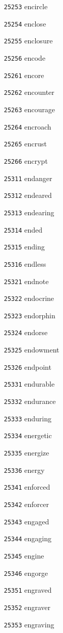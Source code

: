 \documentclass[twoside,11pt]{article}
\begin{document}
\begin{multicols}{5}
\begin{enumerate}
\item[\texttt{25253}] encircle
\item[\texttt{25254}] enclose
\item[\texttt{25255}] enclosure
\item[\texttt{25256}] encode
\item[\texttt{25261}] encore
\item[\texttt{25262}] encounter
\item[\texttt{25263}] encourage
\item[\texttt{25264}] encroach
\item[\texttt{25265}] encrust
\item[\texttt{25266}] encrypt
\item[\texttt{25311}] endanger
\item[\texttt{25312}] endeared
\item[\texttt{25313}] endearing
\item[\texttt{25314}] ended
\item[\texttt{25315}] ending
\item[\texttt{25316}] endless
\item[\texttt{25321}] endnote
\item[\texttt{25322}] endocrine
\item[\texttt{25323}] endorphin
\item[\texttt{25324}] endorse
\item[\texttt{25325}] endowment
\item[\texttt{25326}] endpoint
\item[\texttt{25331}] endurable
\item[\texttt{25332}] endurance
\item[\texttt{25333}] enduring
\item[\texttt{25334}] energetic
\item[\texttt{25335}] energize
\item[\texttt{25336}] energy
\item[\texttt{25341}] enforced
\item[\texttt{25342}] enforcer
\item[\texttt{25343}] engaged
\item[\texttt{25344}] engaging
\item[\texttt{25345}] engine
\item[\texttt{25346}] engorge
\item[\texttt{25351}] engraved
\item[\texttt{25352}] engraver
\item[\texttt{25353}] engraving

\end{enumerate}
\end{multicols}
\end{document}
